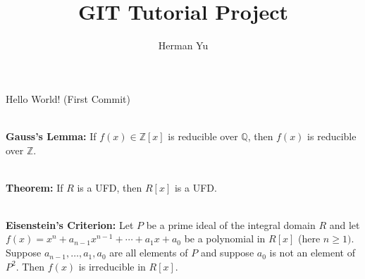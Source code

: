 \documentclass[12pt]{article}
\begin{document}
\title{GIT Tutorial Project}
\date{}
\author{Herman Yu}
\maketitle

Hello World! (First Commit)\par 
\hfill \\
\textbf{Gauss's Lemma:} If $f(x)\in \mathbb{Z}[x]$ is reducible over $\mathbb{Q}$, then $f(x)$ is reducible over $\mathbb{Z}$.\par 
\hfill \\
\textbf{Theorem:} If $R$ is a UFD, then $R[x]$ is a UFD.\par 
\hfill \\
\textbf{Eisenstein's Criterion:} Let $P$ be a prime ideal of the integral domain $R$ and let $f(x)=x^n+a_{n-1}x^{n-1}+\cdots + a_1x+a_0$ be a polynomial in $R[x]$ (here $n\geq 1)$. Suppose $a_{n-1},\dots, a_1,a_0$ are all elements of $P$ and suppose $a_0$ is not an element of $P^2$. Then $f(x)$ is irreducible in $R[x]$.
\end{document}
